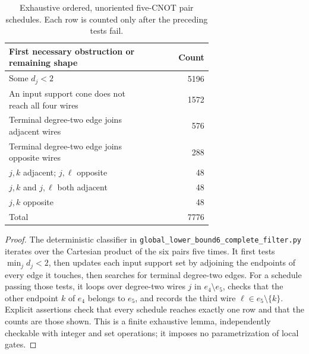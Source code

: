 \documentclass[11pt]{article}
\begin{document}
\begin{table}[ht]
\centering
\caption{Exhaustive ordered, unoriented five-CNOT pair schedules.  Each
row is counted only after the preceding tests fail.}
\label{tab:schedules}
\begin{tabular}{p{0.68\linewidth}r}
\toprule
First necessary obstruction or remaining shape & Count\\
\midrule
Some $d_j<2$ & 5196\\
An input support cone does not reach all four wires & 1572\\
Terminal degree-two edge joins adjacent wires & 576\\
Terminal degree-two edge joins opposite wires & 288\\
$j,k$ adjacent; $j,\ell$ opposite & 48\\
$j,k$ and $j,\ell$ both adjacent & 48\\
$j,k$ opposite & 48\\
\midrule
Total & 7776\\
\bottomrule
\end{tabular}
\end{table}

\begin{proof}
The deterministic classifier in
\texttt{global\_lower\_bound6\_complete\_filter.py} iterates over
the Cartesian product of the six pairs five times.  It first tests
$\min_j d_j<2$, then updates each input support set by adjoining the
endpoints of every edge it touches, then searches for terminal
degree-two edges.  For a schedule passing those tests, it loops over
degree-two wires $j$ in $e_4\setminus e_5$, checks that the other
endpoint $k$ of $e_4$ belongs to $e_5$, and records the third wire
$\ell\in e_5\setminus\{k\}$.  Explicit assertions check that every
schedule reaches exactly one row and that the counts are those shown.
This is a finite exhaustive lemma, independently checkable with integer
and set operations; it imposes no parametrization of local gates.
\end{proof}
\end{document}
